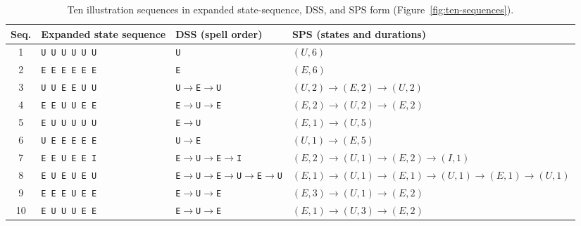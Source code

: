 \begin{table}[htbp]
\centering
\caption{Ten illustration sequences in expanded state-sequence, DSS, and SPS form (Figure~\ref{fig:ten-sequences}).}
\label{tab:ten-sequences-spells}
\footnotesize
\setlength{\tabcolsep}{4pt}
\renewcommand{\arraystretch}{1.15}
\begin{tabularx}{\linewidth}{@{}c l >{\RaggedRight\arraybackslash}p{3.2cm} >{\RaggedRight\arraybackslash}X@{}}
\toprule
\textbf{Seq.} & \textbf{Expanded state sequence} & \textbf{DSS (spell order)} & \textbf{SPS (states and durations)} \\
\midrule
1 & \texttt{U U U U U U} & \texttt{U} & $(U,6)$ \\
2 & \texttt{E E E E E E} & \texttt{E} & $(E,6)$ \\
3 & \texttt{U U E E U U} & \texttt{U}$\to$\texttt{E}$\to$\texttt{U} & $(U,2)\to(E,2)\to(U,2)$ \\
4 & \texttt{E E U U E E} & \texttt{E}$\to$\texttt{U}$\to$\texttt{E} & $(E,2)\to(U,2)\to(E,2)$ \\
5 & \texttt{E U U U U U} & \texttt{E}$\to$\texttt{U} & $(E,1)\to(U,5)$ \\
6 & \texttt{U E E E E E} & \texttt{U}$\to$\texttt{E} & $(U,1)\to(E,5)$ \\
7 & \texttt{E E U E E I} & \texttt{E}$\to$\texttt{U}$\to$\texttt{E}$\to$\texttt{I} & $(E,2)\to(U,1)\to(E,2)\to(I,1)$ \\
8 & \texttt{E U E U E U} & \texttt{E}$\to$\texttt{U}$\to$\texttt{E}$\to$\texttt{U}$\to$\texttt{E}$\to$\texttt{U} & $(E,1)\to(U,1)\to(E,1)\to(U,1)\to(E,1)\to(U,1)$ \\
9 & \texttt{E E E U E E} & \texttt{E}$\to$\texttt{U}$\to$\texttt{E} & $(E,3)\to(U,1)\to(E,2)$ \\
10 & \texttt{E U U U E E} & \texttt{E}$\to$\texttt{U}$\to$\texttt{E} & $(E,1)\to(U,3)\to(E,2)$ \\
\bottomrule
\end{tabularx}
\end{table}
